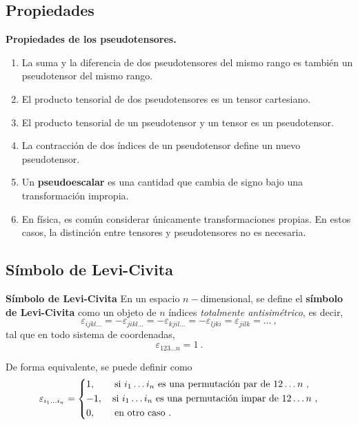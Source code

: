 \subsection{Propiedades}

\begin{propiedad}
    \textbf{Propiedades de los pseudotensores.}

    \begin{enumerate}
        \item La suma y la diferencia de dos pseudotensores del mismo rango es también un pseudotensor del mismo rango.
        \item El producto tensorial de dos pseudotensores es un tensor cartesiano.
        \item El producto tensorial de un pseudotensor y un tensor es un pseudotensor.
        \item La contracción de dos índices de un pseudotensor define un nuevo pseudotensor.
        \item Un \textbf{pseudoescalar} es una cantidad que cambia de signo bajo una transformación impropia.
        \item En física, es común considerar únicamente transformaciones propias. En estos casos, la distinción entre tensores y pseudotensores no es necesaria.
    \end{enumerate}
\end{propiedad}

\subsection{Símbolo de Levi-Civita}

\begin{defi} \textbf{Símbolo de Levi-Civita}
    En un espacio $n-$dimensional, se define el \textbf{símbolo de Levi-Civita} como un objeto de $n$ índices \emph{totalmente antisimétrico}, es decir,
    \begin{equation}
        \varepsilon_{ijkl\dots} = -\varepsilon_{jikl\dots} = - \varepsilon_{kjil\dots} = - \varepsilon_{ljki} = \varepsilon_{jilk} = \dots \ ,
    \end{equation}
    tal que en todo sistema de coordenadas,
    \begin{equation}
        \varepsilon_{123 \dots n} = 1 \ .
    \end{equation}

    De forma equivalente, se puede definir como
    \begin{equation}
        \varepsilon_{i_1 \dots i_n} = \begin{dcases}
            1, \qquad \text{si } i_1 \dots i_n \text{ es una permutación par de } 12 \dots n \ , \\
            -1, \quad \text{si } i_1 \dots i_n \text{ es una permutación impar de } 12 \dots n \ , \\
            0, \qquad \text{en otro caso} \ .
        \end{dcases}
    \end{equation}
\end{defi}

